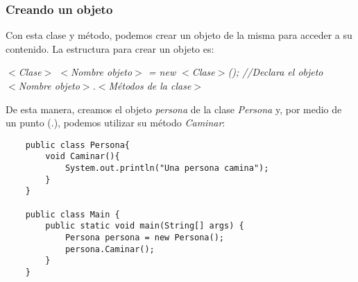 \subsubsection{Creando un objeto}
Con esta clase y método, podemos crear un objeto de la misma para acceder a su contenido. La estructura para crear un objeto es:\begin{center}\textit{$<$Clase$>$ $<$Nombre objeto$>$ = new $<$Clase$>$(); //Declara el objeto\\$<$Nombre objeto$>$.$<$Métodos de la clase$>$}\end{center}
De esta manera, creamos el objeto \textit{persona} de la clase \textit{Persona} y, por medio de un punto (.), podemos utilizar su método \textit{Caminar}:
\begin{lstlisting}
    public class Persona{
        void Caminar(){
            System.out.println("Una persona camina");
        }
    }
    
    public class Main {
        public static void main(String[] args) {
            Persona persona = new Persona();
            persona.Caminar();
        }
    }
\end{lstlisting}

